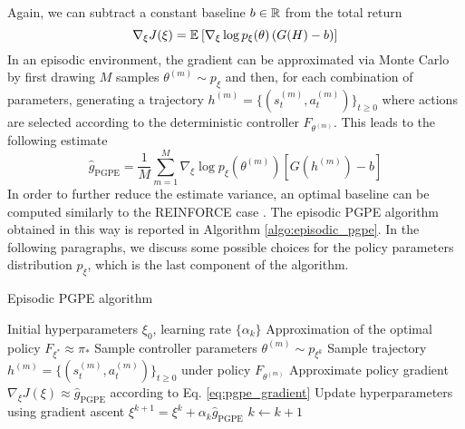 Again, we can subtract a constant baseline $b \in \mathbb{R}$ from the total return 
\begin{equation}
	\nabla_\xi J(\xi) = \mathbb{E}_{}\left[ \nabla_\xi \log p_\xi(\theta)\left(G(H) - b\right) \right]
\end{equation}
In an episodic environment, the gradient can be approximated via Monte Carlo by first drawing $M$ samples $\theta^{(m)} \sim p_\xi$ and then, for each combination of parameters, generating a trajectory $h^{(m)} = \{(s_t^{(m)}, a_t^{(m)})\}_{t \geq 0}$ where actions are selected according to the deterministic controller $F_{\theta^{(m)}}$. This leads to the following estimate
\begin{equation}
\label{eq:pgpe_gradient}
	\widehat{g}_{\text{PGPE}} = \frac{1}{M} \sum^{M}_{m=1} \nabla_\xi \log p_\xi\left(\theta^{(m)}\right) \left[G\left(h^{(m)}\right)-b\right] 
\end{equation}
In order to further reduce the estimate variance, an optimal baseline can be computed similarly to the REINFORCE case \cite{zhao2011analysis}. The episodic PGPE algorithm obtained in this way is reported in Algorithm \ref{algo:episodic_pgpe}. In the following paragraphs, we discuss some possible choices for the policy parameters distribution $p_\xi$, which is the last component of the algorithm. 

\begin{algorithm}[t]
	\caption{Episodic PGPE algorithm}
	\label{algo:episodic_pgpe}
	\begin{algorithmic}[1]
		\Require Initial hyperparameters $\xi_0$, learning rate $\{\alpha_k\}$
		\Ensure Approximation of the optimal policy $F_{\xi^*} \approx \pi_*$
		\Repeat
				\State Sample controller parameters $\theta^{(m)} \sim p_{\xi^k}$ 
				\State Sample trajectory $h^{(m)} = \{(s_t^{(m)}, a_t^{(m)})\}_{t \geq 0}$ under policy $F_{\theta^{(m)}}$
			\EndFor
			\State Approximate policy gradient $\nabla_\xi J(\xi) \approx \widehat{g}_\text{PGPE}$ according to Eq. \ref{eq:pgpe_gradient}
			\State Update hyperparameters using gradient ascent $\xi^{k+1} = \xi^k + \alpha_k \widehat{g}_\text{PGPE}$
			\State $k \leftarrow k + 1$
	\end{algorithmic}
\end{algorithm}

